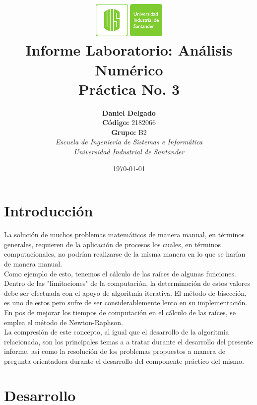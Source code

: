 \documentclass[english,notitlepage,letterpaper, 10pt]{article} %
\newcommand{\university}{\normalsize Universidad Industrial de Santander}
\newcommand{\faculty}{\normalsize  Escuela de Ingenier\'ia de Sistemas e Inform\'atica}
\newcommand{\codigo}{\normalsize  2182066}
\newcommand{\grupo}{\normalsize  B2}
\begin{document}
\title{	\vspace{-12mm}\includegraphics[width=0.2\linewidth]{Logos/UIS.pdf}\\Informe Laboratorio: An\'alisis Num\'erico\\  \centering Práctica No. 3}
\author{
\textbf{Daniel Delgado} \\ \textbf{C\'odigo:} \codigo\\
\textbf{Grupo:} \grupo\\
\textit{\faculty}\\
\textit{\university}}
\date{\today}
\maketitle

\section{Introducci\'on}
  
  La solución de muchos problemas matemáticos de manera manual, en términos generales, requieren de la aplicación de procesos los cuales, en términos computacionales, no podrían realizarse de la misma manera en lo que se harían de manera manual. \\
  \tab Como ejemplo de esto, tenemos el cálculo de las raíces de algunas funciones. Dentro de las "limitaciones" de la computación, la determinación de estos valores debe ser efectuada con el apoyo de algoritmia iterativa. El método de bisección, es uno de estos pero sufre de ser considerablemente lento en su implementación. En pos de mejorar los tiempos de computación en el cálculo de las raíces, se emplea el método de Newton-Raphson. \\
  La compresión de este concepto, al igual que el desarrollo de la algoritmia relacionada, son los principales temas a a tratar durante el desarrollo del presente informe, así como la resolución de los problemas propuestos a manera de pregunta orientadora durante el desarrollo del componente práctico del mismo.

\section{Desarrollo}
\end{document}
